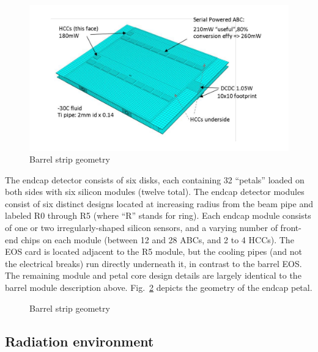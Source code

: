 \begin{figure}[ht]
\centering
\includegraphics[width=0.4\linewidth]{figures/barrelmodule.pdf}
\caption{Barrel strip geometry}
\label{fig:barrelgeometry}
\end{figure}

The endcap detector consists of six disks, each containing 32 ``petals'' loaded on
both sides with six silicon modules (twelve total).
The endcap detector modules consist of six distinct designs located at increasing radius from the
beam pipe and labeled R0 through R5 (where ``R'' stands for ring). Each endcap module consists of one
or two irregularly-shaped silicon sensors, and a varying number of front-end chips on each module
(between 12 and 28 ABCs, and 2 to 4 HCCs). The EOS card is located adjacent to the R5 module, but the
cooling pipes (and not the electrical breaks) run directly underneath it, in contrast to the barrel EOS.
The remaining module and petal core design details are largely identical to the barrel module description above.
Fig.~\ref{fig:endcapgeometry} depicts the geometry of the endcap petal.

\begin{figure}[ht]
\centering
\caption{Barrel strip geometry}
\label{fig:endcapgeometry}
\end{figure}

\subsection{Radiation environment}
